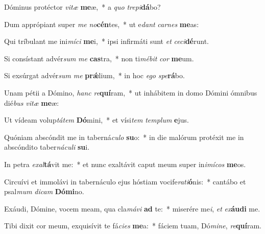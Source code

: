 \item Dóminus protéctor \textit{vi}\textit{tæ} \textbf{me}æ,~* a \textit{quo} \textit{tre}\textit{pi}\textbf{dá}bo?

\item Dum apprópiant super \textit{me} \textit{no}\textbf{cén}tes,~* ut e\textit{dant} \textit{car}\textit{nes} \textbf{me}as:

\item Qui tríbulant me ini\textit{mí}\textit{ci} \textbf{me}i,~* ipsi infirmáti sunt \textit{et} \textit{ce}\textit{ci}\textbf{dé}runt.

\item Si consístant advér\textit{sum} \textit{me} \textbf{cas}tra,~* non ti\textit{mé}\textit{bit} \textit{cor} \textbf{me}um.

\item Si exsúrgat advér\textit{sum} \textit{me} \textbf{prǽ}lium,~* in hoc \textit{e}\textit{go} \textit{spe}\textbf{rá}bo.

\item Unam pétii a Dómino, \textit{hanc} \textit{re}\textbf{quí}ram,~* ut inhábitem in domo Dómini ómnibus dié\textit{bus} \textit{vi}\textit{tæ} \textbf{me}æ:

\item Ut vídeam volup\textit{tá}\textit{tem} \textbf{Dó}mini,~* et vísi\textit{tem} \textit{tem}\textit{plum} \textbf{e}jus.

\item Quóniam abscóndit me in taberná\textit{cu}\textit{lo} \textbf{su}o:~* in die malórum protéxit me in abscóndito taber\textit{ná}\textit{cu}\textit{li} \textbf{su}i.

\item In petra \textit{ex}\textit{al}\textbf{tá}vit me:~* et nunc exaltávit caput meum super in\textit{i}\textit{mí}\textit{cos} \textbf{me}os.

\item Circuívi et immolávi in tabernáculo ejus hóstiam vocife\textit{ra}\textit{ti}\textbf{ó}nis:~* cantábo et psal\textit{mum} \textit{di}\textit{cam} \textbf{Dó}\textbf{mi}no.

\item Exáudi, Dómine, vocem meam, qua cla\textit{má}\textit{vi} \textbf{ad} te:~* miserére me\textit{i}, \textit{et} \textit{ex}\textbf{áu}\textbf{di} me.

\item Tibi dixit cor meum, exquisívit te fá\textit{ci}\textit{es} \textbf{me}a:~* fáciem tuam, Dó\textit{mi}\textit{ne}, \textit{re}\textbf{quí}ram.

